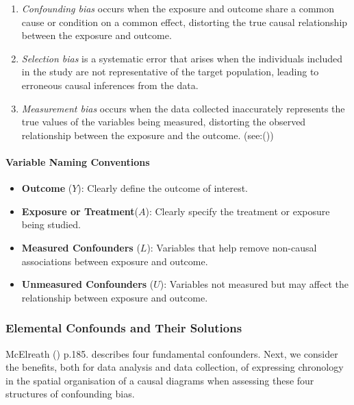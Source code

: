 \documentclass[
  singlecolumn,
  9pt]{article}
\let\oldparagraph\paragraph
\renewcommand{\paragraph}[1]{\oldparagraph{#1}\mbox{}}
\providecommand{\tightlist}{%
  \setlength{\itemsep}{0pt}\setlength{\parskip}{0pt}}\usepackage{longtable,booktabs,array}
\begin{document}
\begin{enumerate}
\def\labelenumi{\alph{enumi}.}
\item
  \emph{Confounding bias} occurs when the exposure and outcome share a
  common cause or condition on a common effect, distorting the true
  causal relationship between the exposure and outcome.
\item
  \emph{Selection bias} is a systematic error that arises when the
  individuals included in the study are not representative of the target
  population, leading to erroneous causal inferences from the data.
\item
  \emph{Measurement bias} occurs when the data collected inaccurately
  represents the true values of the variables being measured, distorting
  the observed relationship between the exposure and the outcome.
  (see:())
\end{enumerate}

\paragraph{Variable Naming
Conventions}\label{variable-naming-conventions}

\begin{itemize}
\tightlist
\item
  \textbf{Outcome} (\(Y\)): Clearly define the outcome of interest.
\item
  \textbf{Exposure or Treatment}(\(A\)): Clearly specify the treatment
  or exposure being studied.
\item
  \textbf{Measured Confounders} (\(L\)): Variables that help remove
  non-causal associations between exposure and outcome.
\item
  \textbf{Unmeasured Confounders} (\(U\)): Variables not measured but
  may affect the relationship between exposure and outcome.
\end{itemize}

\subsubsection{Elemental Confounds and Their
Solutions}\label{elemental-confounds-and-their-solutions}

McElreath () p.185. describes four
fundamental confounders. Next, we consider the benefits, both for data
analysis and data collection, of expressing chronology in the spatial
organisation of a causal diagrams when assessing these four structures
of confounding bias.
\end{document}
